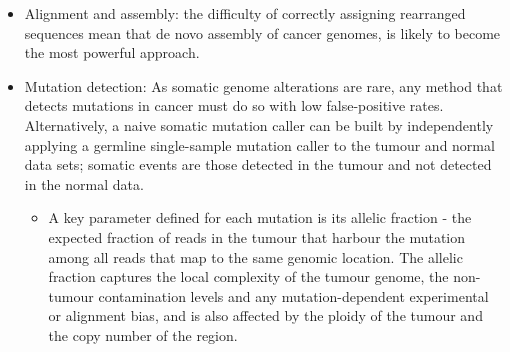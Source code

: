 \documentclass{report}
\begin{document}
\begin{itemize}
	\item Alignment and assembly: the difficulty of correctly assigning rearranged sequences mean that de novo assembly of cancer genomes, is likely to become the most powerful approach.
	
	\item Mutation detection: As somatic genome alterations are rare, any method that detects mutations in cancer must do so with low false-positive rates. Alternatively, a naive somatic mutation caller can be built by independently applying a germline single-sample mutation caller to the tumour and normal data sets; somatic events are those detected in the tumour and not detected in the normal data.
	\begin{itemize}
		\item A key parameter defined for each mutation is its allelic fraction - the expected fraction of reads in the tumour that harbour the mutation among all reads that map to the same genomic location. The allelic fraction captures the local complexity of the tumour genome, the non-tumour contamination levels and any mutation-dependent experimental or alignment bias, and is also affected by the ploidy of the tumour and the copy number of the region. 
	\end{itemize}
	
\end{itemize}
\end{document}
